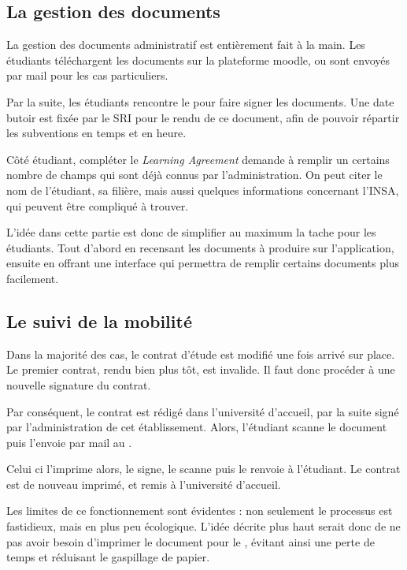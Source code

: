 		\subsection{La gestion  des documents}
		La gestion des documents administratif est entièrement fait à la main. Les étudiants téléchargent les documents sur la plateforme moodle, ou sont envoyés par mail pour les cas particuliers. 
                
                Par la suite, les étudiants rencontre le \ri pour faire signer les documents. Une date butoir est fixée par le SRI pour le rendu de ce document, afin de pouvoir répartir les subventions en temps et en heure. 

\medbreak

Côté étudiant, compléter le \textit{Learning Agreement} demande à remplir un certains nombre de champs qui sont déjà connus par l'administration. On peut citer le nom de l'étudiant, sa filière, mais aussi quelques informations concernant l'INSA, qui peuvent être compliqué à trouver. 

\medbreak

L'idée dans cette partie est donc de simplifier au maximum la tache pour les étudiants. Tout d'abord en recensant les documents à produire sur l'application, ensuite en offrant une interface qui permettra de remplir certains documents plus facilement. 

\subsection{Le suivi de la mobilité}

Dans la majorité des cas, le contrat d'étude est modifié une fois arrivé sur place. Le premier contrat, rendu bien plus tôt, est invalide. Il faut donc procéder à une nouvelle signature du contrat. 

Par conséquent, le contrat est   rédigé dans l'université d'accueil, par la suite  signé par l'administration de cet établissement. Alors, l'étudiant scanne  le document puis l'envoie par mail au \ri. 

Celui ci l'imprime alors, le signe, le scanne puis le renvoie à l'étudiant. Le contrat est  de nouveau imprimé, et remis à l'université d'accueil. 

\medbreak

Les limites de ce fonctionnement sont évidentes : non seulement le processus est fastidieux, mais en plus peu écologique. L'idée décrite plus haut serait donc de ne pas avoir besoin d'imprimer le document pour le \ri, évitant ainsi une perte de temps et réduisant le gaspillage de papier. 

